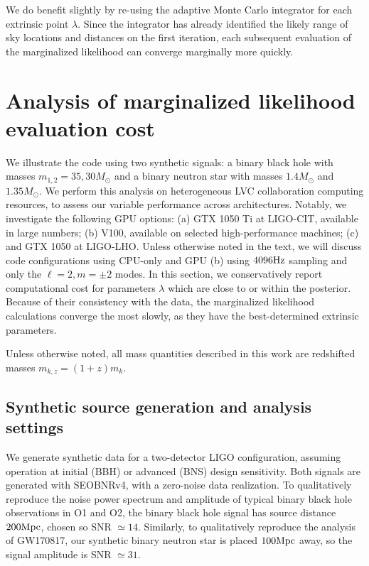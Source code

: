 \documentclass[twocolumn,prd,nofootinbib]{revtex4}
\newcommand\unit[1]{{\rm #1}}
\begin{document}
We do benefit slightly by re-using the adaptive Monte Carlo integrator for each extrinsic point $\lambda$.  Since the
integrator has already identified the likely range of sky locations and distances on the first iteration, each
subsequent evaluation of the marginalized likelihood can converge marginally more quickly.



\section{Analysis of marginalized likelihood evaluation cost}
\label{sec:demo}

We illustrate the code using two synthetic signals: a binary black hole with masses $m_{1,2}=35,30 M_\odot$ and a binary
neutron star with masses $1.4 M_\odot$ and $1.35 M_\odot$.
 We perform this analysis on heterogeneous LVC collaboration computing resources, to assess our variable
performance across architectures.  Notably, we investigate the following GPU options: (a) GTX 1050 Ti at LIGO-CIT,
available in large numbers; (b) V100, available on selected high-performance machines; (c) and
GTX 1050 at LIGO-LHO.    Unless otherwise noted in the text, we will discuss code configurations using CPU-only and GPU (b) using
$4096\unit{Hz}$ sampling and only the  $\ell=2, m=\pm 2$ modes.  In this section, we  conservatively report computational cost for
parameters $\lambda$ which are close to or within the posterior.  Because of their consistency with the data, 
the marginalized likelihood calculations converge the most slowly, as they have the best-determined extrinsic
parameters.

Unless otherwise noted, all mass quantities described in this work are redshifted masses $m_{k,z}=(1+z)m_k$.

\subsection{Synthetic source generation and analysis settings}


We generate  synthetic data for a two-detector LIGO configuration, assuming operation at  initial (BBH) or advanced (BNS) design  sensitivity.
Both signals are generated with SEOBNRv4, with a zero-noise data realization.   
To qualitatively reproduce the noise power spectrum and amplitude of typical binary black hole observations in O1 and
O2, the binary black hole signal has source distance $200 \unit{Mpc}$, chosen so SNR $\simeq 14$.  
Similarly, to qualitatively reproduce the analysis of GW170817, our synthetic binary neutron star is placed $100
\unit{Mpc}$ away, so the signal amplitude is SNR $\simeq 31$.
\end{document}
